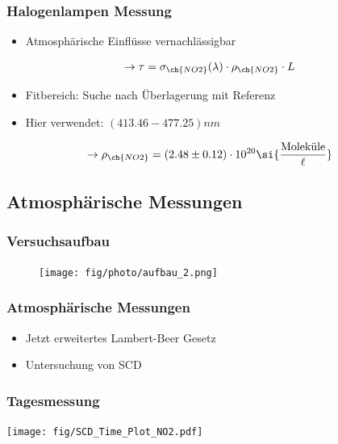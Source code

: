 \documentclass{beamer}
\begin{document}
\begin{frame}
    \frametitle{Halogenlampen Messung}
\begin{itemize}
    \item Atmosphärische Einflüsse vernachlässigbar
\end{itemize}
\begin{align}
 \to \tau = \sigma_{\ch{NO2}}(\lambda) \cdot \rho_{\ch{NO2}} \cdot L
\end{align}
    \begin{itemize}
    \item Fitbereich: Suche nach Überlagerung mit  Referenz
    \item Hier verwendet: $(413.46 - 477.25) \si{nm}$
    \end{itemize}
    \begin{align}
\to \rho_\ch{NO2} = (2.48 \pm 0.12) \cdot 10^{20} \si{\frac{\text{Moleküle}}{\ell}}
    \end{align}
\end{frame}

\begin{frame}
    \section{Atmosphärische Messungen}
    \frametitle{Versuchsaufbau}
    \begin{figure}[h]
        \texttt{[image: fig/photo/aufbau\_2.png]}
    \end{figure}
\end{frame}


\begin{frame}
    \frametitle{Atmosphärische Messungen}
    \begin{itemize}
        \item Jetzt erweitertes Lambert-Beer Gesetz
        \item Untersuchung von SCD
    \end{itemize}
\end{frame}


\begin{frame}
    \frametitle{Tagesmessung }
\begin{center}
    \texttt{[image: fig/SCD\_Time\_Plot\_NO2.pdf]}
    \label{fig:delta_SCD_time_NO2}
\end{center}
\end{frame}
\end{document}
